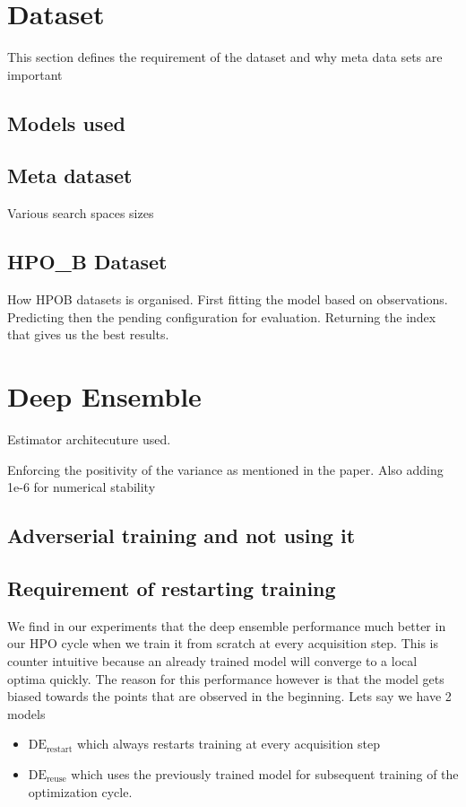 \documentclass[11pt]{report}
\begin{document}
\section{Dataset}
This section defines the requirement of the dataset and why meta data sets are important
\subsection{Models used}
\subsection{Meta dataset}
Various search spaces sizes
\subsection{HPO\_B Dataset}
How HPOB datasets is organised.
First fitting the model based on observations.
Predicting then the pending configuration for evaluation.
Returning the index that gives us the best results.

\section{Deep Ensemble}
Estimator architecuture used.

Enforcing the positivity of the variance as mentioned in the paper.
Also adding 1e-6 for numerical stability

\subsection{Adverserial training and not using it}
    
\subsection{Requirement of restarting training}
We find in our experiments that the deep ensemble performance much better in our HPO cycle when we train it from scratch at every acquisition step.
This is counter intuitive because an already trained model will converge to a local optima quickly.
The reason for this performance however is that the model gets biased towards the points that are observed in the beginning.
Lets say we have 2 models 
\begin{itemize}
\item $\textrm{DE}_{\textrm{restart}}$ which always restarts training at every acquisition step
\item $\textrm{DE}_{\textrm{reuse}}$ which uses the previously trained model for subsequent training of the optimization cycle.
\end{itemize}
\end{document}
